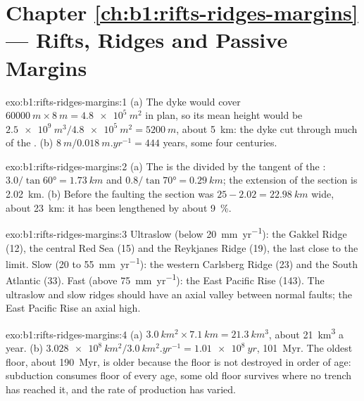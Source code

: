 \section*{Chapter \ref{ch:b1:rifts-ridges-margins} --- Rifts, Ridges and Passive Margins}

\begin{solution}{exo:b1:rifts-ridges-margins:1}
(a) The dyke would cover $\qty{60000}{m}\times\qty{8}{m} = \qty{4.8e5}{m^2}$ in
plan, so its mean height would be $\qty{2.5e9}{m^3}/\qty{4.8e5}{m^2} =
\qty{5200}{m}$, about \qty{5}{km}: the dyke cut through much of the .
(b) $\qty{8}{m}/\qty{0.018}{m.yr^{-1}} = 444$ years, some four centuries.
\end{solution}

\begin{solution}{exo:b1:rifts-ridges-margins:2}
(a) The  is the  divided by the tangent of the :
$3.0/\tan\ang{60} = \qty{1.73}{km}$ and $0.8/\tan\ang{70} = \qty{0.29}{km}$;
the extension of the section is \qty{2.02}{km}. (b) Before the faulting the
section was $25 - 2.02 = \qty{22.98}{km}$ wide, about \qty{23}{km}: it has been
lengthened by about \qty{9}{\percent}.
\end{solution}

\begin{solution}{exo:b1:rifts-ridges-margins:3}
Ultraslow (below \qty{20}{mm.yr^{-1}}): the Gakkel Ridge (12), the central Red
Sea (15) and the Reykjanes Ridge (19), the last close to the limit. Slow (20 to
\qty{55}{mm.yr^{-1}}): the western Carlsberg Ridge (23) and the South Atlantic
(33). Fast (above \qty{75}{mm.yr^{-1}}): the East Pacific Rise (143). The
ultraslow and slow ridges should have an axial valley between normal faults; the
East Pacific Rise an axial high.
\end{solution}

\begin{solution}{exo:b1:rifts-ridges-margins:4}
(a) $\qty{3.0}{km^2}\times\qty{7.1}{km} = \qty{21.3}{km^3}$, about
\qty{21}{km^3} a year. (b) $\qty{3.028e8}{km^2}/\qty{3.0}{km^2.yr^{-1}} =
\qty{1.01e8}{yr}$, \qty{101}{Myr}. The oldest floor, about \qty{190}{Myr}, is
older because the floor is not destroyed in order of age: subduction consumes
floor of every age, some old floor survives where no trench has reached it,
and the rate of production has varied.
\end{solution}

